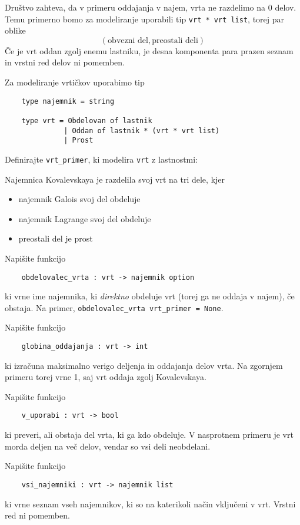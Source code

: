 \documentclass[arhiv]{../izpit}
\begin{document}
Društvo zahteva, da v primeru oddajanja v najem, vrta ne razdelimo na 0 delov.
Temu primerno bomo za modeliranje uporabili tip \verb|vrt * vrt list|, torej par oblike
\[(\text{obvezni del}, \text{preostali deli})\]
Če je vrt oddan zgolj enemu lastniku, je desna komponenta para prazen seznam in vrstni red delov ni pomemben.

Za modeliranje vrtičkov uporabimo tip
\begin{verbatim}
    type najemnik = string

    type vrt = Obdelovan of lastnik
              | Oddan of lastnik * (vrt * vrt list)
              | Prost
\end{verbatim}

\podnaloga
Definirajte \verb|vrt_primer|, ki modelira \verb|vrt| z lastnostmi:

Najemnica Kovalevskaya je razdelila svoj vrt na tri dele, kjer
\begin{itemize}[noitemsep]
\item najemnik Galois svoj del obdeluje
\item najemnik Lagrange svoj del obdeluje
\item preostali del je prost
\end{itemize}

\podnaloga
Napišite funkcijo
\begin{verbatim}
    obdelovalec_vrta : vrt -> najemnik option
\end{verbatim}
ki vrne ime najemnika, ki \emph{direktno} obdeluje vrt (torej ga ne oddaja v najem), če obstaja. Na primer, \verb|obdelovalec_vrta vrt_primer = None|.

\podnaloga
Napišite funkcijo
\begin{verbatim}
    globina_oddajanja : vrt -> int
\end{verbatim}
ki izračuna maksimalno verigo deljenja in oddajanja delov vrta. Na zgornjem primeru torej vrne 1, saj vrt oddaja zgolj Kovalevskaya.

\podnaloga
Napišite funkcijo
\begin{verbatim}
    v_uporabi : vrt -> bool
\end{verbatim}
ki preveri, ali obstaja del vrta, ki ga kdo obdeluje. V nasprotnem primeru je vrt morda deljen na več delov, vendar so vsi deli neobdelani.

\podnaloga
Napišite funkcijo
\begin{verbatim}
    vsi_najemniki : vrt -> najemnik list
\end{verbatim}
ki vrne seznam vseh najemnikov, ki so na katerikoli način vključeni v vrt. Vrstni red ni pomemben.
\end{document}
